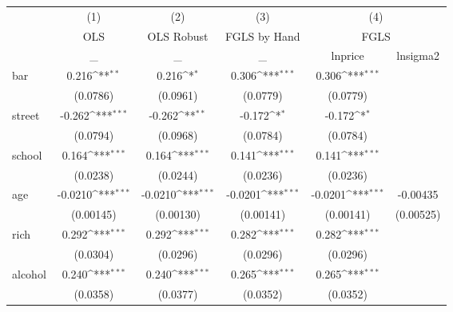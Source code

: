 {
\def\sym#1{\ifmmode^{#1}\else\(^{#1}\)\fi}
\begin{tabular}{l*{5}{c}}
\hline\hline
            &\multicolumn{1}{c}{(1)}&\multicolumn{1}{c}{(2)}&\multicolumn{1}{c}{(3)}&\multicolumn{2}{c}{(4)}                    \\
            &\multicolumn{1}{c}{OLS}&\multicolumn{1}{c}{OLS Robust}&\multicolumn{1}{c}{FGLS by Hand}&\multicolumn{2}{c}{FGLS}                   \\
            &           \_         &           \_         &           \_         &     lnprice         &    lnsigma2         \\
\hline
bar         &       0.216\sym{**} &       0.216\sym{*}  &       0.306\sym{***}&       0.306\sym{***}&                     \\
            &    (0.0786)         &    (0.0961)         &    (0.0779)         &    (0.0779)         &                     \\
[1em]
street      &      -0.262\sym{***}&      -0.262\sym{**} &      -0.172\sym{*}  &      -0.172\sym{*}  &                     \\
            &    (0.0794)         &    (0.0968)         &    (0.0784)         &    (0.0784)         &                     \\
[1em]
school      &       0.164\sym{***}&       0.164\sym{***}&       0.141\sym{***}&       0.141\sym{***}&                     \\
            &    (0.0238)         &    (0.0244)         &    (0.0236)         &    (0.0236)         &                     \\
[1em]
age         &     -0.0210\sym{***}&     -0.0210\sym{***}&     -0.0201\sym{***}&     -0.0201\sym{***}&    -0.00435         \\
            &   (0.00145)         &   (0.00130)         &   (0.00141)         &   (0.00141)         &   (0.00525)         \\
[1em]
rich        &       0.292\sym{***}&       0.292\sym{***}&       0.282\sym{***}&       0.282\sym{***}&                     \\
            &    (0.0304)         &    (0.0296)         &    (0.0296)         &    (0.0296)         &                     \\
[1em]
alcohol     &       0.240\sym{***}&       0.240\sym{***}&       0.265\sym{***}&       0.265\sym{***}&                     \\
            &    (0.0358)         &    (0.0377)         &    (0.0352)         &    (0.0352)         &                     \\

\end{tabular}}
